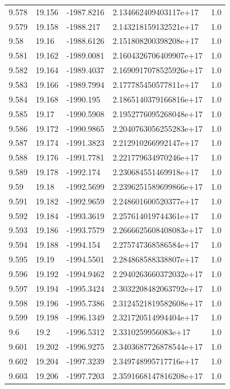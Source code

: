 \begin{tabular}{lllll}
9.578 & 19.156 & -1987.8216 & 2.134662409403117e+17 & 1.0 \\
9.579 & 19.158 & -1988.217 & 2.143218159132521e+17 & 1.0 \\
9.58 & 19.16 & -1988.6126 & 2.151808200398208e+17 & 1.0 \\
9.581 & 19.162 & -1989.0081 & 2.1604326706409907e+17 & 1.0 \\
9.582 & 19.164 & -1989.4037 & 2.1690917078525926e+17 & 1.0 \\
9.583 & 19.166 & -1989.7994 & 2.177785450577811e+17 & 1.0 \\
9.584 & 19.168 & -1990.195 & 2.1865140379166816e+17 & 1.0 \\
9.585 & 19.17 & -1990.5908 & 2.1952776095268048e+17 & 1.0 \\
9.586 & 19.172 & -1990.9865 & 2.2040763056255283e+17 & 1.0 \\
9.587 & 19.174 & -1991.3823 & 2.212910266992147e+17 & 1.0 \\
9.588 & 19.176 & -1991.7781 & 2.221779634970246e+17 & 1.0 \\
9.589 & 19.178 & -1992.174 & 2.230684551469918e+17 & 1.0 \\
9.59 & 19.18 & -1992.5699 & 2.2396251589699866e+17 & 1.0 \\
9.591 & 19.182 & -1992.9659 & 2.248601600520377e+17 & 1.0 \\
9.592 & 19.184 & -1993.3619 & 2.257614019744361e+17 & 1.0 \\
9.593 & 19.186 & -1993.7579 & 2.2666625608408083e+17 & 1.0 \\
9.594 & 19.188 & -1994.154 & 2.275747368586584e+17 & 1.0 \\
9.595 & 19.19 & -1994.5501 & 2.284868588338807e+17 & 1.0 \\
9.596 & 19.192 & -1994.9462 & 2.2940263660372032e+17 & 1.0 \\
9.597 & 19.194 & -1995.3424 & 2.3032208482063792e+17 & 1.0 \\
9.598 & 19.196 & -1995.7386 & 2.3124521819582608e+17 & 1.0 \\
9.599 & 19.198 & -1996.1349 & 2.321720514994404e+17 & 1.0 \\
9.6 & 19.2 & -1996.5312 & 2.3310259956083e+17 & 1.0 \\
9.601 & 19.202 & -1996.9275 & 2.3403687726878544e+17 & 1.0 \\
9.602 & 19.204 & -1997.3239 & 2.349748995717716e+17 & 1.0 \\
9.603 & 19.206 & -1997.7203 & 2.3591668147816208e+17 & 1.0 \\

\end{tabular}
